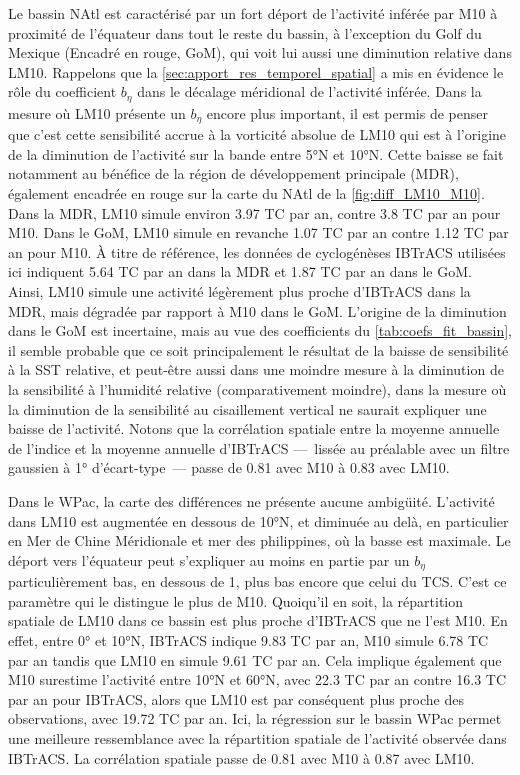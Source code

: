 \documentclass[../main.tex]{subfiles}
\begin{document}
Le bassin NAtl est caractérisé par un fort déport de l'activité inférée par M10 à proximité de l'équateur dans tout le reste du bassin, à l'exception du Golf du
Mexique (Encadré en rouge, GoM), qui voit lui aussi une diminution relative dans LM10. Rappelons que la \cref{sec:apport_res_temporel_spatial} a mis en évidence
le rôle du coefficient $b_\eta$ dans le décalage méridional de l'activité inférée. Dans la mesure où LM10 présente un $b_\eta$ encore plus important, il est
permis de penser que c'est cette sensibilité accrue à la vorticité absolue de LM10 qui est à l'origine de la diminution de l'activité sur la bande entre
\ang{5}N et \ang{10}N. Cette baisse se fait notamment au bénéfice de la région de développement principale (MDR), également encadrée en rouge sur la carte du
NAtl de la \cref{fig:diff_LM10_M10}. Dans la MDR, LM10 simule environ \num{3.97} TC par an, contre \num{3.8} TC par an pour M10. Dans le GoM, LM10 simule en
revanche \num{1.07} TC par an contre \num{1.12} TC par an pour M10. À titre de référence, les données de cyclogénèses IBTrACS utilisées ici indiquent \num{5.64}
TC par an dans la MDR et \num{1.87} TC par an dans le GoM. Ainsi, LM10 simule une activité légèrement plus proche d'IBTrACS dans la MDR, mais dégradée par
rapport à M10 dans le GoM. L'origine de la diminution dans le GoM est incertaine, mais au vue des coefficients du \cref{tab:coefs_fit_bassin}, il semble
probable que ce soit principalement le résultat de la baisse de sensibilité à la SST relative, et peut-être aussi dans une moindre mesure à la diminution de la
sensibilité à l'humidité relative (comparativement moindre), dans la mesure où la diminution de la sensibilité
au cisaillement vertical ne saurait expliquer une baisse de l'activité. Notons que la corrélation spatiale entre la moyenne annuelle de l'indice et la moyenne
annuelle d'IBTrACS ---~lissée au préalable avec un filtre gaussien à \ang{1} d'écart-type~--- passe de \num{0.81} avec M10 à \num{0.83} avec LM10.

Dans le WPac, la carte des différences ne présente aucune ambigüité. L'activité dans LM10 est augmentée en dessous de \ang{10}N, et diminuée au delà, en
particulier en Mer de Chine Méridionale et mer des philippines, où la basse est maximale. Le déport vers l'équateur peut s'expliquer au moins en partie par un
$b_\eta$ particulièrement bas, en dessous de \num{1}, plus bas encore que celui du TCS. C'est ce paramètre qui le distingue le plus de M10. Quoiqu'il en soit,
la répartition spatiale de LM10 dans ce bassin est plus proche d'IBTrACS que ne l'est M10. En effet, entre \ang{0} et \ang{10}N, IBTrACS indique \num{9.83} TC
par an, M10 simule \num{6.78} TC par an tandis que LM10 en simule \num{9.61} TC par an. Cela implique également que M10 surestime l'activité entre \ang{10}N et
\ang{60}N, avec \num{22.3} TC par an contre \num{16.3} TC par an pour IBTrACS, alors que LM10 est par conséquent plus proche des observations, avec \num{19.72}
TC par an. Ici, la régression sur le bassin WPac permet une meilleure ressemblance avec la répartition spatiale de l'activité observée dans IBTrACS. La
corrélation spatiale passe de \num{0.81} avec M10 à \num{0.87} avec LM10.
\end{document}

